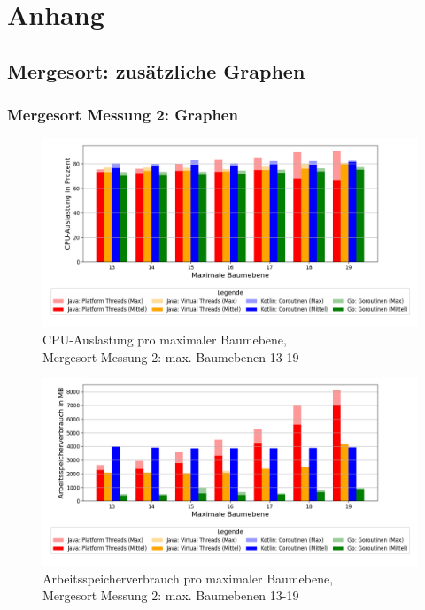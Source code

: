 \documentclass[fontsize=12pt,paper=a4,twoside=semi,parskip=half-,headsepline,headinclude]{scrreprt}
\begin{document}
\chapter{Anhang}

\section{Mergesort: zusätzliche Graphen}

\subsection{Mergesort Messung 2: Graphen}

\begin{figure}[H]
	\centering
	\includegraphics[scale=0.5]{figures/mergesort/Maximalebauebenen1-19_pvcg/cpu_usage_bar_plot.png}
	\caption{CPU-Auslastung pro maximaler Baumebene,\\ Mergesort Messung 2: max. Baumebenen 13-19}
	\label{fig:ms1-19CPU}
\end{figure}

\begin{figure}[H]
	\centering
	\includegraphics[scale=0.5]{figures/mergesort/Maximalebauebenen1-19_pvcg/memory_usage_bar_plot.png}
	\caption{Arbeitsspeicherverbrauch pro maximaler Baumebene,\\ Mergesort Messung 2: max. Baumebenen 13-19}
	\label{fig:ms1-19RAM}
\end{figure}
\end{document}
